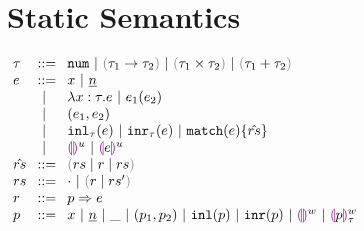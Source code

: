 \section{Static Semantics}
$\arraycolsep=4pt\begin{array}{lll}
\tau & ::= &
  \tnum ~\vert~
  \tarr{\tau_1}{\tau_2} ~\vert~
  \tprod{\tau_1}{\tau_2} ~\vert~
  \tsum{\tau_1}{\tau_2} \\
e & ::= &
  x ~\vert~
  \hnum{n} \\
  & ~\vert~ &
  \hlam{x}{\tau}{e} ~\vert~
  \hap{e_1}{e_2} \\
  & ~\vert~ &
  \hpair{e_1}{e_2} \\
  & ~\vert~ &
  \hinl{\tau}{e} ~\vert~
  \hinr{\tau}{e} ~\vert~
  \hmatch{e}{\hat{rs}} \\
  & ~\vert~ &
  \hehole{u} ~\vert~
  \hhole{e}{u} \\
\hat{rs} & ::= &
  \inparens{\zruls{rs}{r}{rs}} \\
rs & ::= &
  \cdot ~\vert~ \hrulesP{r}{rs'} \\
r & ::= &
  \hrul{p}{e} \\
p & ::= &
  x ~\vert~
  \hnum{n} ~\vert~
  \_ ~\vert~
  \hpair{p_1}{p_2} ~\vert~
  \hinlp{p} ~\vert~
  \hinrp{p} ~\vert~
  \heholep{w} ~\vert~
  \hholep{p}{w}{\tau}
\end{array}$

